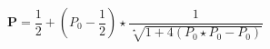 \begin{equation}
    \label{eq:defProj}
    \mathbf{P} = \frac{1}{2} + \left(P_0 - \frac{1}{2}\right) 
    \star \frac{1}{\sqrt[\star]{1 + 4 (P_0 \star P_0 - P_0)}}
\end{equation}

